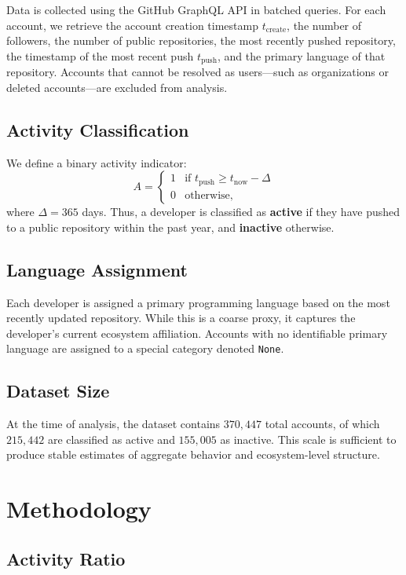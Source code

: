 \documentclass[12pt,a4paper]{article}
\begin{document}
Data is collected using the GitHub GraphQL API in batched queries. For each account, we retrieve the account creation timestamp $t_{\text{create}}$, the number of followers, the number of public repositories, the most recently pushed repository, the timestamp of the most recent push $t_{\text{push}}$, and the primary language of that repository. Accounts that cannot be resolved as users---such as organizations or deleted accounts---are excluded from analysis.

\subsection{Activity Classification}

We define a binary activity indicator:
\[
A =
\begin{cases}
1 & \text{if } t_{\text{push}} \geq t_{\text{now}} - \Delta \\
0 & \text{otherwise,}
\end{cases}
\]
where $\Delta = 365$ days. Thus, a developer is classified as \textbf{active} if they have pushed to a public repository within the past year, and \textbf{inactive} otherwise.

\subsection{Language Assignment}

Each developer is assigned a primary programming language based on the most recently updated repository. While this is a coarse proxy, it captures the developer's current ecosystem affiliation. Accounts with no identifiable primary language are assigned to a special category denoted \texttt{None}.

\subsection{Dataset Size}

At the time of analysis, the dataset contains $370{,}447$ total accounts, of which $215{,}442$ are classified as active and $155{,}005$ as inactive. This scale is sufficient to produce stable estimates of aggregate behavior and ecosystem-level structure.

\section{Methodology}

\subsection{Activity Ratio}
\end{document}
